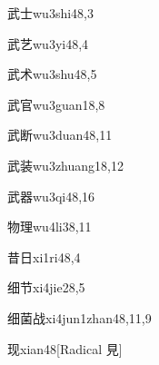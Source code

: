 \begin{verbete}{武士}{wu3shi4}{8,3}
\end{verbete}

\begin{verbete}{武艺}{wu3yi4}{8,4}
\end{verbete}

\begin{verbete}{武术}{wu3shu4}{8,5}
\end{verbete}

\begin{verbete}{武官}{wu3guan1}{8,8}
\end{verbete}

\begin{verbete}{武断}{wu3duan4}{8,11}
\end{verbete}

\begin{verbete}{武装}{wu3zhuang1}{8,12}
\end{verbete}

\begin{verbete}{武器}{wu3qi4}{8,16}
\end{verbete}

\begin{verbete}{物理}{wu4li3}{8,11}
\end{verbete}

\begin{verbete}{昔日}{xi1ri4}{8,4}
\end{verbete}

\begin{verbete}{细节}{xi4jie2}{8,5}
\end{verbete}

\begin{verbete}{细菌战}{xi4jun1zhan4}{8,11,9}
\end{verbete}

\begin{verbete}{现}{xian4}{8}[Radical 見]
\end{verbete}

